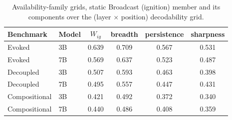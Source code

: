 \begin{table}[h]
\centering
\caption{Availability-family grids, static Broadcast (ignition) member and its
components over the (layer $\times$ position) decodability grid.}
\label{tab:appA7b}
\small
\begin{tabular}{llcccc}
\toprule
Benchmark & Model & $W_{ig}$ & breadth & persistence & sharpness \\
\midrule
Evoked & 3B & 0.639 & 0.709 & 0.567 & 0.531 \\
Evoked & 7B & 0.569 & 0.637 & 0.523 & 0.487 \\
Decoupled & 3B & 0.507 & 0.593 & 0.463 & 0.398 \\
Decoupled & 7B & 0.495 & 0.557 & 0.447 & 0.431 \\
Compositional & 3B & 0.421 & 0.492 & 0.372 & 0.340 \\
Compositional & 7B & 0.440 & 0.486 & 0.408 & 0.359 \\
\bottomrule
\end{tabular}
\end{table}
